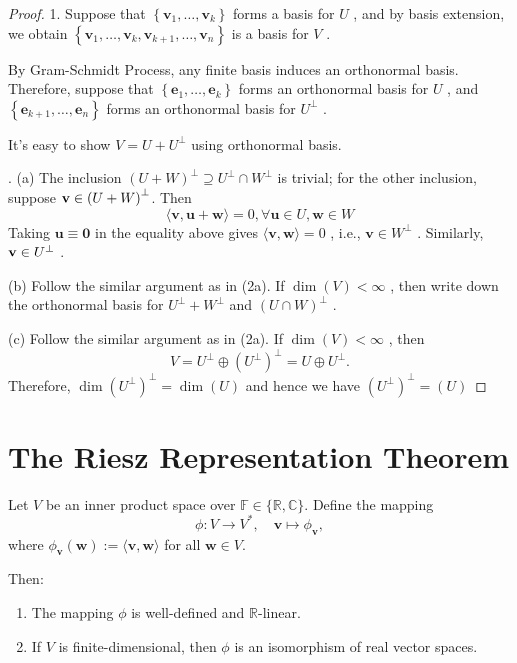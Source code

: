 \begin{proof} 1. Suppose that \(\left\{  {{\mathbf{v}}_{1},\ldots ,{\mathbf{v}}_{k}}\right\}\) forms a basis for \(U\) , and by basis extension, we obtain \(\left\{  {{\mathbf{v}}_{1},\ldots ,{\mathbf{v}}_{k},{\mathbf{v}}_{k + 1},\ldots ,{\mathbf{v}}_{n}}\right\}\) is a basis for \(V\) .

By Gram-Schmidt Process, any finite basis induces an orthonormal basis. Therefore, suppose that \(\left\{  {{\mathbf{e}}_{1},\ldots ,{\mathbf{e}}_{k}}\right\}\) forms an orthonormal basis for \(U\) , and \(\left\{  {{\mathbf{e}}_{k + 1},\ldots ,{\mathbf{e}}_{n}}\right\}\) forms an orthonormal basis for \({U}^{\perp}\) .

It’s easy to show \(V = U + {U}^{\perp}\) using orthonormal basis.

. (a) The inclusion \({\left( U + W\right) }^{\perp} \supseteq  {U}^{\perp} \cap  {W}^{\perp}\) is trivial; for the other inclusion, suppose
\({\bf v} \in  {\left( U + W\right) }^{\perp}\). Then
\[
\langle \mathbf{v},\mathbf{u} + \mathbf{w}\rangle  = 0,\forall \mathbf{u} \in  U,\mathbf{w} \in  W
\]
Taking \(\mathbf{u} \equiv  \mathbf{0}\) in the equality above gives \(\langle \mathbf{v},\mathbf{w}\rangle  = 0\) , i.e., \(\mathbf{v} \in  W^{\perp}\) . Similarly, \({\bf v} \in U^{\perp}\) .

(b) Follow the similar argument as in (2a). If \(\dim \left( V\right)  < \infty\) , then write down the orthonormal basis for \({U}^{\perp} + {W}^{\perp}\) and \({\left( U \cap  W\right) }^{\perp}\) .

(c) Follow the similar argument as in (2a). If \(\dim \left( V\right)  < \infty\) , then
\[
V = {U}^{\perp} \oplus  {\left( {U}^{\perp}\right) }^{\perp} = U \oplus  {U}^{\perp}.
\]
Therefore, \(\dim{\left( {U}^{\perp}\right) }^{\perp} = \dim(U)\) and hence we have \({\left( {U}^{\perp}\right)}^{\perp} = (U)\)
\end{proof}



\section{The Riesz Representation Theorem}

\begin{theorem}\label{thm:riesz}
Let \( V \) be an inner product space over \( \mathbb{F} \in \{ \mathbb{R}, \mathbb{C} \} \). Define the mapping
\[
\phi : V \to V^*, \quad \mathbf{v} \mapsto \phi_{\mathbf{v}},
\]
where \( \phi_{\mathbf{v}}(\mathbf{w}) := \langle \mathbf{v}, \mathbf{w} \rangle \) for all \( \mathbf{w} \in V \).

Then:
\begin{enumerate}
    \item The mapping \( \phi \) is well-defined and \(\mathbb{R}\)-linear.
    \item If \( V \) is finite-dimensional, then \( \phi \) is an isomorphism of real vector spaces.
\end{enumerate}
\end{theorem}

